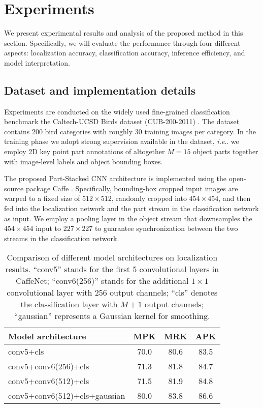 \documentclass[10pt,twocolumn,letterpaper]{article}
\makeatletter
\DeclareRobustCommand\onedot{\futurelet\@let@token\@onedot}
\def\@onedot{\ifx\@let@token.\else.\null\fi\xspace}
\def\ie{\emph{i.e}\onedot} \def\Ie{\emph{I.e}\onedot}
\makeatother
\begin{document}
\section{Experiments}\label{sec:exp}
We present experimental results and analysis of the proposed method in this section. Specifically, we will evaluate the performance through four different aspects: localization accuracy, classification accuracy, inference efficiency, and model interpretation.

\subsection{Dataset and implementation details}
Experiments are conducted on the widely used fine-grained classification benchmark the Caltech-UCSD Birds dataset (CUB-200-2011) \cite{wah2011caltech}. The dataset contains $200$ bird categories with roughly $30$ training images per category. In the training phase we adopt strong supervision available in the dataset, \ie we employ 2D key point part annotations of altogether $M=15$ object parts together with image-level labels and object bounding boxes.





The proposed Part-Stacked CNN architecture is implemented using the open-source package Caffe \cite{jia2014caffe}.
Specifically, bounding-box cropped input images are warped to a fixed size of $512\times512$, randomly cropped into $454\times454$, and then fed into the localization network and the part stream in the classification network as input. We employ a pooling layer in the object stream that downsamples the $454\times454$ input to $227\times227$ to guarantee synchronization between the two streams in the classification network.

\begin{table}
\begin{center}
\small
\begin{tabular}{l|c|c|c}
\hline
Model architecture & MPK & MRK & APK \\
\hline
conv5+cls & 70.0 & 80.6 & 83.5 \\
conv5+conv6(256)+cls & 71.3 & 81.8 & 84.7 \\
conv5+conv6(512)+cls & 71.5 & 81.9 & 84.8 \\
conv5+conv6(512)+cls+gaussian & 80.0 & 83.8 & 86.6 \\
\hline
\end{tabular}
\end{center}
\caption{Comparison of different model architectures on localization results. ``conv5'' stands for the first 5 convolutional layers in CaffeNet; ``conv6(256)'' stands for the additional $1\times1$ convolutional layer with 256 output channels; ``cls'' denotes the classification layer with $M+1$ output channels; ``gaussian'' represents a Gaussian kernel for smoothing.}
\label{tab:locarc}
\end{table}
\end{document}
